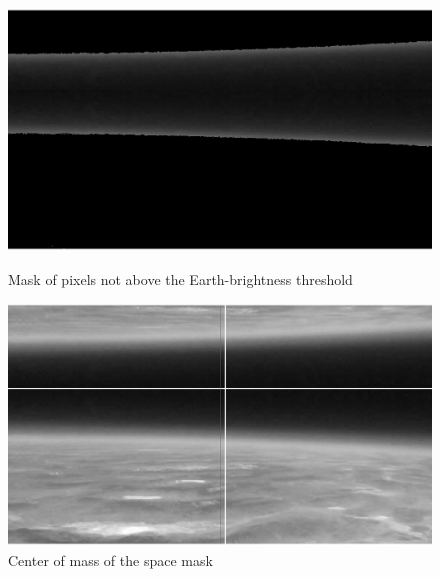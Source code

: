 \documentclass[10pt]{article}
\begin{document}
\begin{figure}[h]
        \begin{minipage}{.45\textwidth}
            \centering
                \includegraphics[width=\linewidth]{plots_tables_images/spacemask.eps}
                \caption{Mask of pixels not above the Earth-brightness threshold}
        \end{minipage}
        \hspace{.5in}
        \begin{minipage}{.45\textwidth}
            \centering
                \includegraphics[width=\linewidth]{plots_tables_images/spreadc.eps}
                \caption{Center of mass of the space mask}
        \end{minipage}
    \end{figure}
\end{document}
